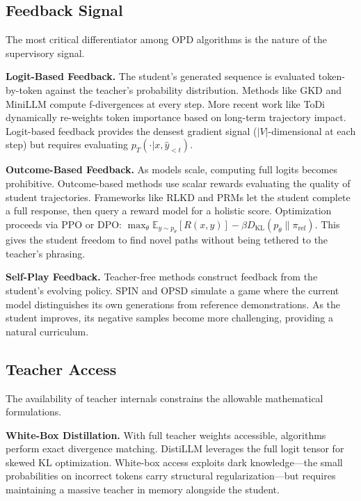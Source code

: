 \documentclass{article} %
\newcommand{\KL}{D_{\mathrm{KL}}}
\newcommand{\ptheta}{p_\theta}
\newcommand{\pteacher}{p_T}
\begin{document}
\subsection{Feedback Signal}
\label{subsec:tax_feedback}

The most critical differentiator among OPD algorithms is the nature of the supervisory signal.

\textbf{Logit-Based Feedback.} The student's generated sequence is evaluated token-by-token against the teacher's probability distribution. Methods like GKD \citep{2306.13649} and MiniLLM \citep{2306.08543} compute f-divergences at every step. More recent work like ToDi \citep{2505.16297} dynamically re-weights token importance based on long-term trajectory impact. Logit-based feedback provides the densest gradient signal ($|V|$-dimensional at each step) but requires evaluating $\pteacher(\cdot|x, \hat{y}_{<t})$.

\textbf{Outcome-Based Feedback.} As models scale, computing full logits becomes prohibitive. Outcome-based methods use scalar rewards evaluating the quality of student trajectories. Frameworks like RLKD \citep{2505.16142} and PRMs \citep{2305.20050} let the student complete a full response, then query a reward model for a holistic score. Optimization proceeds via PPO or DPO: $\max_\theta \mathbb{E}_{y \sim \ptheta} [R(x, y)] - \beta \KL(\ptheta \parallel \pi_{\mathrm{ref}})$. This gives the student freedom to find novel paths without being tethered to the teacher's phrasing.

\textbf{Self-Play Feedback.} Teacher-free methods construct feedback from the student's evolving policy. SPIN \citep{2401.01335} and OPSD \citep{2601.18734} simulate a game where the current model distinguishes its own generations from reference demonstrations. As the student improves, its negative samples become more challenging, providing a natural curriculum.

\subsection{Teacher Access}
\label{subsec:tax_access}

The availability of teacher internals constrains the allowable mathematical formulations.

\textbf{White-Box Distillation.} With full teacher weights accessible, algorithms perform exact divergence matching. DistiLLM \citep{2402.03898} leverages the full logit tensor for skewed KL optimization. White-box access exploits dark knowledge---the small probabilities on incorrect tokens carry structural regularization---but requires maintaining a massive teacher in memory alongside the student.
\end{document}
